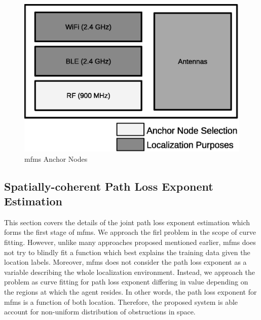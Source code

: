     \begin{figure}[thpb]
       \centering
       \includegraphics[width=\linewidth]{figures/mfms_module.eps}
       \caption{\label{fig:module}\gls{mfms} Anchor Nodes}
    \end{figure}

    \subsection{Spatially-coherent Path Loss Exponent Estimation}
    This section covers the details of the joint path loss exponent estimation which forms the first stage of \gls{mfms}.
    We approach the \gls{firl} problem in the scope of curve fitting.
    However, unlike many approaches proposed mentioned earlier, \gls{mfms} does not try to blindly fit a function which best explains the training data given the location labels.
    Moreover, \gls{mfms} does not consider the path loss exponent as a variable describing the whole localization environment.
    Instead, we approach the problem as curve fitting for path loss exponent differing in value depending on the regions at which the agent resides.
    In other words, the path loss exponent for \gls{mfms} is a function of both location.
    Therefore, the proposed system is able account for non-uniform distribution of obstructions in space.

